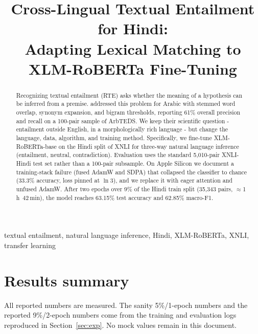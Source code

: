 \documentclass[conference]{IEEEtran}
\newcommand{\TestAcc}{63.15\%}
\newcommand{\TestF}{62.85\%}
\begin{document}
\title{Cross-Lingual Textual Entailment for Hindi:\\
Adapting Lexical Matching to XLM-RoBERTa Fine-Tuning}

\author{
}

\maketitle

\begin{abstract}
Recognizing textual entailment (RTE) asks whether the meaning of a hypothesis can be inferred from a premise. \citet{khader2016textual} addressed this problem for Arabic with stemmed word overlap, synonym expansion, and bigram thresholds, reporting 61\% overall precision and recall on a 100-pair sample of ArbTEDS. We keep their scientific question - entailment outside English, in a morphologically rich language - but change the language, data, algorithm, and training method. Specifically, we fine-tune XLM-RoBERTa-base on the Hindi split of XNLI for three-way natural language inference (entailment, neutral, contradiction). Evaluation uses the standard 5{,}010-pair XNLI-Hindi test set rather than a 100-pair subsample. On Apple Silicon we document a training-stack failure (fused AdamW and SDPA) that collapsed the classifier to chance (33.3\% accuracy, loss pinned at $\ln 3$), and we replace it with eager attention and unfused AdamW. After two epochs over 9\% of the Hindi train split (35{,}343 pairs, $\approx$1\,h~42\,min), the model reaches \TestAcc{} test accuracy and \TestF{} macro-F1.
\end{abstract}

\begin{IEEEkeywords}
textual entailment, natural language inference, Hindi, XLM-RoBERTa, XNLI, transfer learning
\end{IEEEkeywords}

\section{Results summary}
\label{sec:checklist}
All reported numbers are measured. The sanity 5\%/1-epoch numbers and the reported 9\%/2-epoch numbers come from the training and evaluation logs reproduced in Section~\ref{sec:exp}. No mock values remain in this document.
\end{document}
